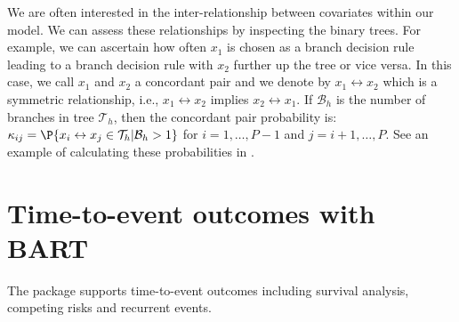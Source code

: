 \documentclass[article]{jss}
\begin{document}
We are often interested in the inter-relationship between covariates
within our model.  We can assess these relationships by inspecting the
binary trees.  For example, we can ascertain how often $x_1$ is chosen
as a branch decision rule leading to a branch decision rule with $x_2$
further up the tree or vice versa.  In this case, we call $x_1$ and
$x_2$ a concordant pair and we denote by $x_1 \leftrightarrow x_2$
which is a symmetric relationship, i.e., $x_1 \leftrightarrow x_2$
implies $x_2 \leftrightarrow x_1$.  If $\mathcal{B}_h$ is the number
of branches in tree $\mathcal{T}_h$, then the concordant pair
probability is:
$\kappa_{ij} = \P{x_i \leftrightarrow x_j \in
  \mathcal{T}_h|\mathcal{B}_h>1}$
for $i=1, \dots, P-1$ and $j=i+1, \dots, P$.  See an example of
calculating these probabilities in
.

\section{Time-to-event outcomes with BART}\label{surv}

The  package supports time-to-event outcomes including
survival analysis, competing risks and recurrent events.

\end{document}
